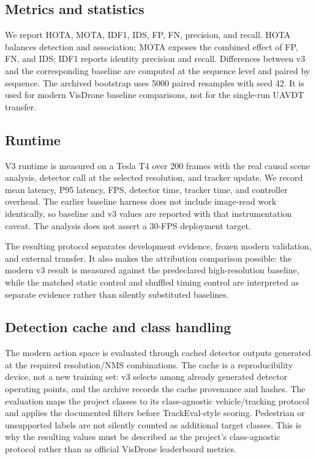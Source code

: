 \subsection{Metrics and statistics}
We report HOTA, MOTA, IDF1, IDS, FP, FN, precision, and recall. HOTA balances detection and association; MOTA exposes the combined effect of FP, FN, and IDS; IDF1 reports identity precision and recall. Differences between v3 and the corresponding baseline are computed at the sequence level and paired by sequence. The archived bootstrap uses 5000 paired resamples with seed 42. It is used for modern VisDrone baseline comparisons, not for the single-run UAVDT transfer.

\subsection{Runtime}
V3 runtime is measured on a Tesla T4 over 200 frames with the real causal scene analysis, detector call at the selected resolution, and tracker update. We record mean latency, P95 latency, FPS, detector time, tracker time, and controller overhead. The earlier baseline harness does not include image-read work identically, so baseline and v3 values are reported with that instrumentation caveat. The analysis does not assert a 30-FPS deployment target.

The resulting protocol separates development evidence, frozen modern validation, and external transfer. It also makes the attribution comparison possible: the modern v3 result is measured against the predeclared high-resolution baseline, while the matched static control and shuffled timing control are interpreted as separate evidence rather than silently substituted baselines.

\subsection{Detection cache and class handling}
The modern action space is evaluated through cached detector outputs generated at the required resolution/NMS combinations. The cache is a reproducibility device, not a new training set: v3 selects among already generated detector operating points, and the archive records the cache provenance and hashes. The evaluation maps the project classes to its class-agnostic vehicle/tracking protocol and applies the documented filters before TrackEval-style scoring. Pedestrian or unsupported labels are not silently counted as additional target classes. This is why the resulting values must be described as the project's class-agnostic protocol rather than as official VisDrone leaderboard metrics.

